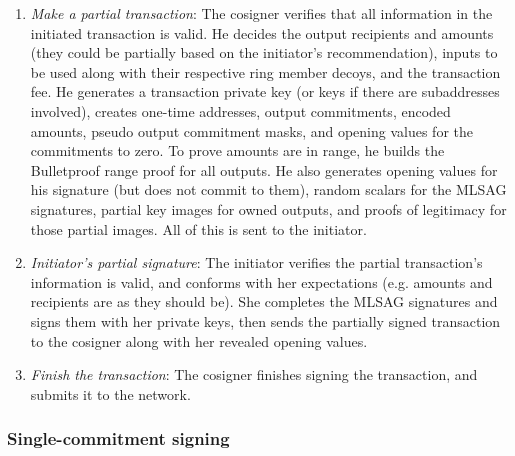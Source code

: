 \begin{enumerate}
\begin{enumerate}
        \item {\em Make a partial transaction}: The cosigner verifies that all information in the initiated transaction is valid. He decides the output recipients and amounts (they could be partially based on the initiator's recommendation), inputs to be used along with their respective ring member decoys, and the transaction fee. He generates a transaction private key (or keys if there are subaddresses involved), creates one-time addresses, output commitments, encoded amounts, pseudo output commitment masks, and opening values for the commitments to zero. To prove amounts are in range, he builds the Bulletproof range proof for all outputs. He also generates opening values for his signature (but does not commit to them), random scalars for the MLSAG signatures, partial key images for owned outputs, and proofs of legitimacy for those partial images. All of this is sent to the initiator.
        \item {\em Initiator's partial signature}: The initiator verifies the partial transaction's information is valid, and conforms with her expectations (e.g. amounts and recipients are as they should be). She completes the MLSAG signatures and signs them with her private keys, then sends the partially signed transaction to the cosigner along with her revealed opening values.
        \item {\em Finish the transaction}: The cosigner finishes signing the transaction, and submits it to the network.
    \end{enumerate}{}
\end{enumerate}{}

\subsubsection*{Single-commitment signing}

